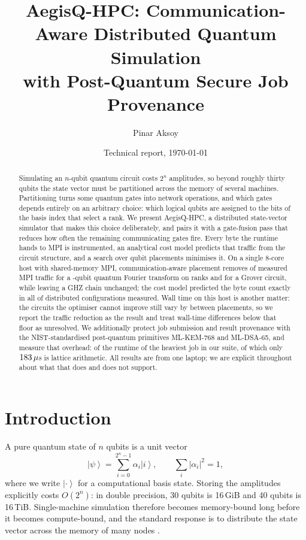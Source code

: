 \documentclass[11pt]{article}
\title{AegisQ-HPC: Communication-Aware Distributed Quantum Simulation\\
       with Post-Quantum Secure Job Provenance}
\author{Pinar Aksoy}
\date{Technical report, \today}
\newcommand{\ket}[1]{\left|#1\right\rangle}
\begin{document}
\maketitle

\begin{abstract}
Simulating an $n$-qubit quantum circuit costs $2^n$ amplitudes, so beyond
roughly thirty qubits the state vector must be partitioned across the memory
of several machines. Partitioning turns some quantum gates into network
operations, and which gates depends entirely on an arbitrary choice: which
logical qubits are assigned to the bits of the basis index that select a rank.
We present AegisQ-HPC, a distributed state-vector simulator that makes this
choice deliberately, and pairs it with a gate-fusion pass that reduces how
often the remaining communicating gates fire. Every byte the runtime hands to MPI is instrumented, an
analytical cost model predicts that traffic from the circuit structure, and a
search over qubit placements minimises it. On a single 8-core host with
shared-memory MPI, communication-aware placement removes \aegisqQftTraffic{} of
measured MPI traffic for a \aegisqQubits-qubit quantum Fourier transform on
\aegisqRanks{} ranks and \aegisqGroverTraffic{} for a Grover circuit, while
leaving a GHZ chain unchanged; the cost model predicted the byte count exactly
in all \aegisqExactPredictions{} of \aegisqPredictionConfigs{} distributed
configurations measured. Wall time on this host is another matter: the circuits
the optimiser cannot improve still vary by \aegisqWallNoiseFloor{} between
placements, so we report the traffic reduction as the result and treat
wall-time differences below that floor as unresolved. We additionally protect job submission
and result provenance with the NIST-standardised post-quantum primitives
ML-KEM-768 and ML-DSA-65, and measure that overhead: \aegisqEnvelopeOverhead{} of the runtime
of the heaviest job in our suite, of which only $183\,\mu$s is lattice
arithmetic. All results are from one laptop; we are explicit throughout about
what that does and does not support.
\end{abstract}

\section{Introduction}

A pure quantum state of $n$ qubits is a unit vector
\begin{equation}
\ket{\psi} = \sum_{i=0}^{2^n-1} \alpha_i \ket{i}, \qquad
\sum_i |\alpha_i|^2 = 1 ,
\end{equation}
where we write $\ket{\cdot}$ for a computational basis state. Storing the
amplitudes explicitly costs $O(2^n)$: in double precision, 30 qubits is
16\,GiB and 40 qubits is 16\,TiB. Single-machine simulation therefore becomes
memory-bound long before it becomes compute-bound, and the standard response is
to distribute the state vector across the memory of many nodes
\cite{deraedt2007,quest2019}.
\end{document}
